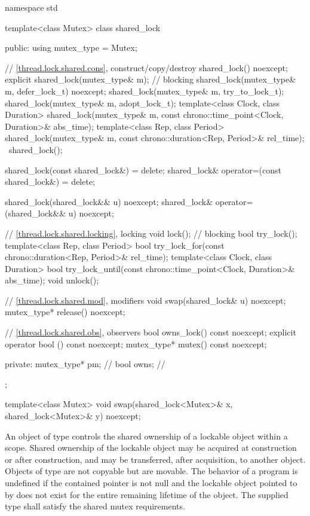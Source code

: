%
\begin{codeblock}
namespace std {
  template<class Mutex>
  class shared_lock {
  public:
    using mutex_type = Mutex;

    // \ref{thread.lock.shared.cons}, construct/copy/destroy
    shared_lock() noexcept;
    explicit shared_lock(mutex_type& m);        // blocking
    shared_lock(mutex_type& m, defer_lock_t) noexcept;
    shared_lock(mutex_type& m, try_to_lock_t);
    shared_lock(mutex_type& m, adopt_lock_t);
    template<class Clock, class Duration>
      shared_lock(mutex_type& m, const chrono::time_point<Clock, Duration>& abs_time);
    template<class Rep, class Period>
      shared_lock(mutex_type& m, const chrono::duration<Rep, Period>& rel_time);
    ~shared_lock();

    shared_lock(const shared_lock&) = delete;
    shared_lock& operator=(const shared_lock&) = delete;

    shared_lock(shared_lock&& u) noexcept;
    shared_lock& operator=(shared_lock&& u) noexcept;

    // \ref{thread.lock.shared.locking}, locking
    void lock();                                // blocking
    bool try_lock();
    template<class Rep, class Period>
      bool try_lock_for(const chrono::duration<Rep, Period>& rel_time);
    template<class Clock, class Duration>
      bool try_lock_until(const chrono::time_point<Clock, Duration>& abs_time);
    void unlock();

    // \ref{thread.lock.shared.mod}, modifiers
    void swap(shared_lock& u) noexcept;
    mutex_type* release() noexcept;

    // \ref{thread.lock.shared.obs}, observers
    bool owns_lock() const noexcept;
    explicit operator bool () const noexcept;
    mutex_type* mutex() const noexcept;

  private:
    mutex_type* pm;                             // \expos
    bool owns;                                  // \expos
  };

  template<class Mutex>
    void swap(shared_lock<Mutex>& x, shared_lock<Mutex>& y) noexcept;
}
\end{codeblock}

\pnum
An object of type  controls the shared ownership of a
lockable object within a scope. Shared ownership of the lockable object may be
acquired at construction or after construction, and may be transferred, after
acquisition, to another  object. Objects of type
 are not copyable but are movable. The behavior of a program
is undefined if the contained pointer  is not null and the lockable
object pointed to by  does not exist for the entire remaining
lifetime of the  object. The supplied
 type shall satisfy the shared mutex
requirements.

